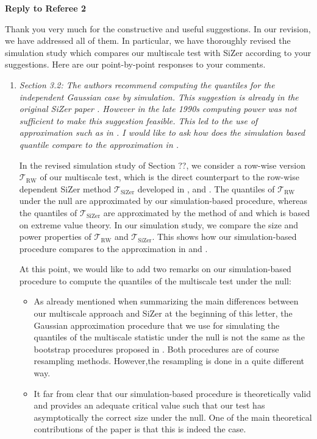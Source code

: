 \documentclass[a4paper,12pt]{article}
\begin{document}
\newpage
\begin{center}
{\large \bf Reply to Referee 2} 
\end{center}


Thank you very much for the constructive and useful suggestions. In our revision, we have addressed all of them. In particular, we have thoroughly revised the simulation study which compares our multiscale test with SiZer according to your suggestions. Here are our point-by-point responses to your comments. 


\begin{enumerate}[label=(\arabic*),leftmargin=0.8cm]

\item \textit{Section 3.2: The authors recommend computing the quantiles for the independent Gaussian case by simulation. This suggestion is already in the original SiZer paper \citep{ChaudhuriMarron1999}. However in the late 1990s computing power was not sufficient to make this suggestion feasible. This led to the use of approximation such as in \cite{HannigMarron2006}. I would like to ask how does the simulation based quantile compare to the approximation in \cite{HannigMarron2006}.} 

In the revised simulation study of Section ??, we consider a row-wise version $\mathcal{T}_{\text{RW}}$ of our multiscale test, which is the direct counterpart to the row-wise dependent SiZer method $\mathcal{T}_{\text{SiZer}}$ developed in \cite{Rondonotti2004}, \cite{Rondonotti2007} and \cite{ParkHannigKang2009}. The quantiles of $\mathcal{T}_{\text{RW}}$ under the null are approximated by our simulation-based procedure, whereas the quantiles of $\mathcal{T}_{\text{SiZer}}$ are approximated by the method of \cite{HannigMarron2006} and \cite{ParkHannigKang2009} which is based on extreme value theory. In our simulation study, we compare the size and power properties of $\mathcal{T}_{\text{RW}}$ and $\mathcal{T}_{\text{SiZer}}$. This shows how our simulation-based procedure compares to the approximation in \cite{HannigMarron2006} and \cite{ParkHannigKang2009}.


At this point, we would like to add two remarks on our simulation-based procedure to compute the quantiles of the multiscale test under the null: 
\begin{itemize}[leftmargin=0.5cm]
\item As already mentioned when summarizing the main differences between our multiscale approach and SiZer at the beginning of this letter, the Gaussian approximation procedure that we use for simulating the quantiles of the multiscale statistic under the null is not the same as the bootstrap procedures proposed in \cite{ChaudhuriMarron1999, ChaudhuriMarron2000}. Both procedures are of course resampling methods. However,the resampling is done in a quite different way. 
\item It far from clear that our simulation-based procedure is theoretically valid and provides an adequate critical value such that our test has asymptotically the correct size under the null. One of the main theoretical contributions of the paper is that this is indeed the case. 
\end{itemize}



\end{enumerate}
\end{document}
